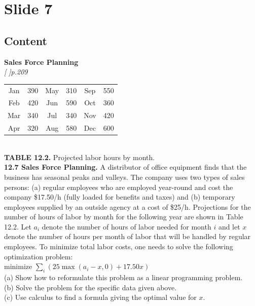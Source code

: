 \documentclass{article}%
\begin{document}
%
\newpage%
\section{Slide 7}%
\label{sec:Slide7}%
\subsection{Content}%

\textbf{Sales Force Planning} \\
\textit{[ ]p.209} \\
\begin{tabular}{|c|c|c|c|c|c|}
\hline
Jan & 390 & May & 310 & Sep & 550 \\
Feb & 420 & Jun & 590 & Oct & 360 \\
Mar & 340 & Jul & 340 & Nov & 420 \\
Apr & 320 & Aug & 580 & Dec & 600 \\
\hline
\end{tabular} \\
\textbf{TABLE 12.2.} Projected labor hours by month. \\
\textbf{12.7 Sales Force Planning.} A distributor of office equipment finds that the business has seasonal peaks and valleys. The company uses two types of sales persons: (a) regular employees who are employed year-round and cost the company \$17.50/h (fully loaded for benefits and taxes) and (b) temporary employees supplied by an outside agency at a cost of \$25/h. Projections for the number of hours of labor by month for the following year are shown in Table 12.2. Let $a_i$ denote the number of hours of labor needed for month $i$ and let $x$ denote the number of hours per month of labor that will be handled by regular employees. To minimize total labor costs, one needs to solve the following optimization problem: \\
minimize $\sum_i (25 \max(a_i - x, 0) + 17.50x)$ \\
(a) Show how to reformulate this problem as a linear programming problem. \\
(b) Solve the problem for the specific data given above. \\
(c) Use calculus to find a formula giving the optimal value for $x$.
%
\end{document}

